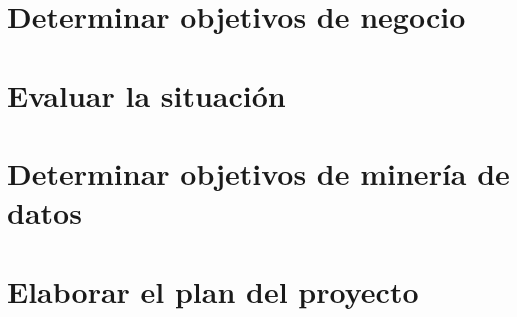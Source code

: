 \documentclass[11pt,letterpaper,DIV=12]{scrartcl}
\begin{document}


\tableofcontents
\clearpage

\section{Determinar objetivos de negocio}





\section{Evaluar la situación}







\section{Determinar objetivos de minería de datos}




\section{Elaborar el plan del proyecto}




\printbibliography
\end{document}
